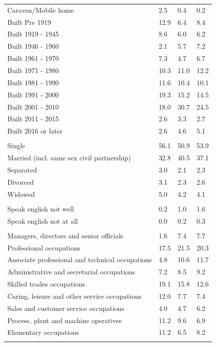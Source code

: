 \documentclass{article}
\begin{document}
\begin{table}[h]
\begin{tabular}{KTTT}
Caravan/Mobile home & 2.5& 0.4& 0.2\\
    \hline
Built Pre 1919 & 12.9&  6.4&  8.4\\
Built 1919 - 1945 & 8.6& 6.0& 6.2\\
Built  1946 - 1960 & 2.1& 5.7& 7.2\\
Built  1961 - 1970 & 7.3& 4.7& 6.7\\
Built  1971 - 1980 & 10.3& 11.0& 12.2\\
Built  1981 - 1990 & 11.6& 10.4& 10.1\\
Built  1991 - 2000 & 19.3& 15.2& 14.5\\
Built  2001 - 2010 & 18.0& 30.7& 24.5\\
Built  2011 - 2015 & 2.6& 3.3& 2.7\\
Built  2016 or later & 2.6& 4.6& 5.1\\
\hline
    \\
    \hline
Single & 56.1& 50.9& 53.9\\
Married (incl. same sex civil partnership) & 32.8& 40.5& 37.1\\
Separated  & 3.0& 2.1& 2.3\\
Divorced  & 3.1& 2.3& 2.6\\
Widowed & 5.0& 4.2& 4.1\\
\hline
    \\ 
    \hline
Speak english not well & 0.2& 1.0& 1.6\\
Speak english not at all & 0.0& 0.2& 0.3\\
\hline
    \\
    \hline
Managers, directors and senior officials & 1.6& 7.4& 7.7\\
Professional occupations & 17.5& 21.5& 20.3\\
Associate professional and technical occupations &  4.8& 10.6& 11.7\\
Administrative and secretarial occupations & 7.2& 8.5& 9.2\\
Skilled trades occupations & 19.1& 15.8& 12.6\\
Caring, leisure and other service occupations & 12.0&  7.7&  7.4\\
Sales and customer service occupations & 4.0& 4.7& 6.2\\
Process, plant and machine operatives & 11.2&  9.6&  6.9\\
Elementary occupations & 11.2&  6.5&  8.2\\
\hline
\end{tabular}
\end{table}
\end{document}
